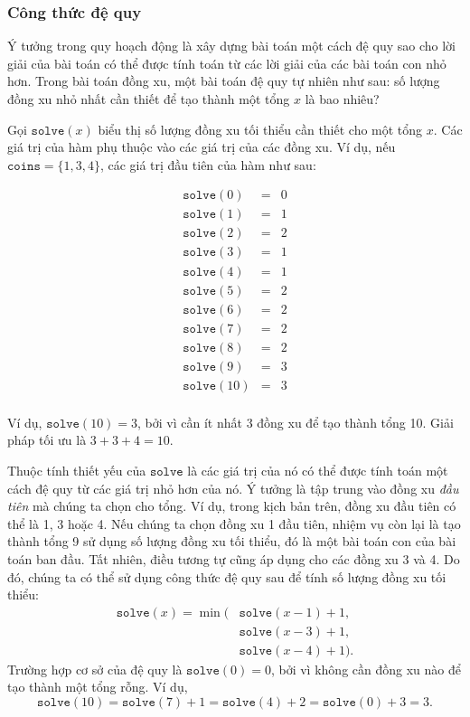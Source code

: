 \subsubsection{Công thức đệ quy}

Ý tưởng trong quy hoạch động là
xây dựng bài toán một cách đệ quy sao cho
lời giải của bài toán có thể được
tính toán từ các lời giải của các bài toán con nhỏ hơn.
Trong bài toán đồng xu, một bài toán
đệ quy tự nhiên như sau:
số lượng đồng xu nhỏ nhất
cần thiết để tạo thành một tổng $x$ là bao nhiêu?

Gọi $\texttt{solve}(x)$
biểu thị số lượng
đồng xu tối thiểu cần thiết cho một tổng $x$.
Các giá trị của hàm phụ thuộc vào
các giá trị của các đồng xu.
Ví dụ, nếu $\texttt{coins} = \{1,3,4\}$,
các giá trị đầu tiên của hàm như sau:

\[
\begin{array}{lcl}
\texttt{solve}(0) & = & 0 \\
\texttt{solve}(1) & = & 1 \\
\texttt{solve}(2) & = & 2 \\
\texttt{solve}(3) & = & 1 \\
\texttt{solve}(4) & = & 1 \\
\texttt{solve}(5) & = & 2 \\
\texttt{solve}(6) & = & 2 \\
\texttt{solve}(7) & = & 2 \\
\texttt{solve}(8) & = & 2 \\
\texttt{solve}(9) & = & 3 \\
\texttt{solve}(10) & = & 3 \\
\end{array}
\]

Ví dụ, $\texttt{solve}(10)=3$,
bởi vì cần ít nhất 3 đồng xu
để tạo thành tổng 10.
Giải pháp tối ưu là $3+3+4=10$.

Thuộc tính thiết yếu của $\texttt{solve}$ là
các giá trị của nó có thể được
tính toán một cách đệ quy từ các giá trị nhỏ hơn của nó.
Ý tưởng là tập trung vào đồng xu \emph{đầu tiên}
mà chúng ta chọn cho tổng.
Ví dụ, trong kịch bản trên,
đồng xu đầu tiên có thể là 1, 3 hoặc 4.
Nếu chúng ta chọn đồng xu 1 đầu tiên,
nhiệm vụ còn lại là tạo thành tổng 9
sử dụng số lượng đồng xu tối thiểu,
đó là một bài toán con của bài toán ban đầu.
Tất nhiên, điều tương tự cũng áp dụng cho các đồng xu 3 và 4.
Do đó, chúng ta có thể sử dụng công thức đệ quy sau
để tính số lượng đồng xu tối thiểu:
\begin{equation*}
\begin{split}
\texttt{solve}(x) = \min( & \texttt{solve}(x-1)+1, \\
                           & \texttt{solve}(x-3)+1, \\
                           & \texttt{solve}(x-4)+1).
\end{split}
\end{equation*}
Trường hợp cơ sở của đệ quy là $\texttt{solve}(0)=0$,
bởi vì không cần đồng xu nào để tạo thành một tổng rỗng.
Ví dụ,
\[ \texttt{solve}(10) = \texttt{solve}(7)+1 = \texttt{solve}(4)+2 = \texttt{solve}(0)+3 = 3.\]

